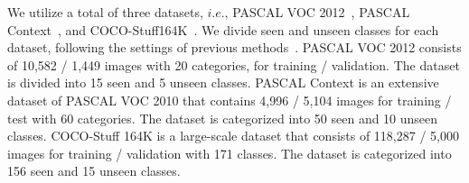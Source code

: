 \documentclass[nohyperref]{article}
\theoremstyle{plain}
\theoremstyle{definition}
\theoremstyle{remark}
\begin{document}
We utilize a total of three datasets, $\textit{i.e.,}$ PASCAL VOC 2012~\cite{everingham2012pascal}, PASCAL  Context~\cite{mottaghi2014role}, and COCO-Stuff164K~\cite{caesar2018coco}. 
We divide seen and unseen classes for each dataset, following the settings of previous methods~\cite{bucher2019zero,xu2021zsseg,ding2022zegformer,zhou2022maskclip,zhou2022zegclip}. PASCAL VOC 2012 consists of 10,582 / 1,449 images with 20 categories, for training / validation. The dataset is divided into 15 seen and 5 unseen classes. PASCAL Context is an extensive dataset of PASCAL VOC 2010 that contains 4,996 / 5,104 images for training / test with 60 categories. The dataset is categorized into 50 seen and 10 unseen classes. COCO-Stuff 164K is a large-scale dataset that consists of 118,287 / 5,000 images for training / validation with 171 classes. The dataset is categorized into 156 seen and 15 unseen classes. 


\end{document}
